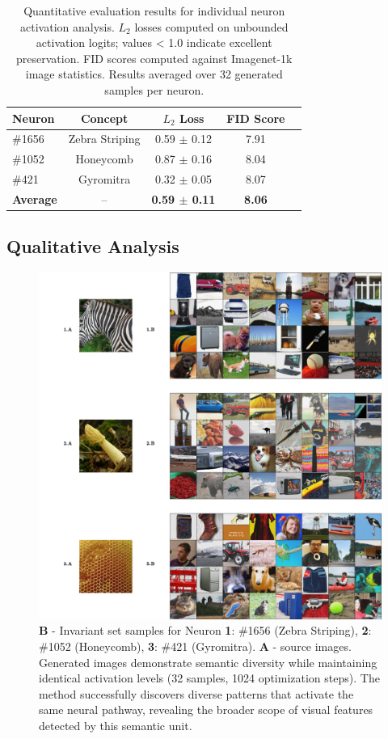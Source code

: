 \documentclass[licencjacka,en]{pracamgr}
\begin{document}
\begin{table}[h!]
\centering
\begin{tabular}{lcccc}
\toprule
\textbf{Neuron} & \textbf{Concept} & \textbf{$L_2$ Loss} & \textbf{FID Score}\\
\midrule
\#1656 & Zebra Striping & 0.59 $\pm$ 0.12 & 7.91 \\
\#1052 & Honeycomb & 0.87 $\pm$ 0.16 & 8.04\\
\#421 & Gyromitra & 0.32 $\pm$ 0.05 & 8.07\\
\midrule
\textbf{Average} & -- & \textbf{0.59 $\pm$ 0.11} & \textbf{8.06}  \\
\bottomrule
\end{tabular}
\caption{Quantitative evaluation results for individual neuron activation analysis. $L_2$ losses computed on unbounded activation logits; values < 1.0 indicate excellent preservation. FID scores computed against Imagenet-1k  image statistics. Results averaged over 32 generated samples per neuron.}
\label{tab:neuron_results}
\end{table}

\subsection{Qualitative Analysis}

\begin{figure}[h]
\centering
\includegraphics[width=\linewidth]{figures/main/sae_results_1.png}
\caption{ \textbf{B} - Invariant set samples for Neuron \textbf{1}: \#1656 (Zebra Striping), \textbf{2}: \#1052 (Honeycomb), \textbf{3}: \#421 (Gyromitra). \textbf{A} - source images. Generated images demonstrate semantic diversity while maintaining identical activation levels (32 samples, 1024 optimization steps). The method successfully discovers diverse patterns that activate the same neural pathway, revealing the broader scope of visual features detected by this semantic unit.}
\label{fig:experiment_1_1}
\end{figure}
\end{document}
